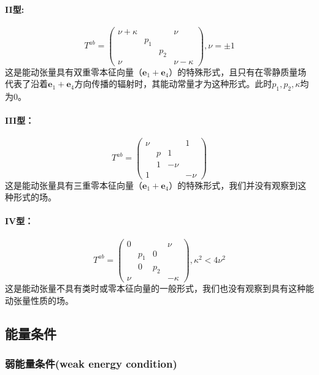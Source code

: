 \documentclass[hyperref, UTF8, a4paper]{ctexart}
\begin{document}
\paragraph{II型:}
\begin{equation*}
	T^{ab} =\begin{pmatrix}
		\nu +\kappa  &  &  & \nu \\
		& p_{1} &  & \\
		&  & p_{2} & \\
		\nu  &  &  & \nu -\kappa 
	\end{pmatrix} ,\nu =\pm 1
\end{equation*}
这是能动张量具有双重零本征向量（$\boldsymbol{e}_{1} +\boldsymbol{e}_{4}$）的特殊形式，且只有在零静质量场代表了沿着$\boldsymbol{e}_{1} +\boldsymbol{e}_{4}$方向传播的辐射时，其能动常量才为这种形式。此时$p_{1} ,p_{2} ,\kappa $均为$0$。

\paragraph{III型：}
\begin{equation*}
	T^{ab} =\begin{pmatrix}
		\nu  &  &  & 1\\
		& p & 1 & \\
		& 1 & -\nu  & \\
		1 &  &  & -\nu 
	\end{pmatrix}
\end{equation*}
这是能动张量具有三重零本征向量（$\boldsymbol{e}_{1} +\boldsymbol{e}_{4}$）的特殊形式，我们并没有观察到这种形式的场。

\paragraph{IV型：}
\begin{equation*}
	T^{ab} =\begin{pmatrix}
		0 &  &  & \nu \\
		& p_{1} & 0 & \\
		& 0 & p_{2} & \\
		\nu  &  &  & -\kappa 
	\end{pmatrix} ,\kappa ^{2} < 4\nu ^{2}
\end{equation*}
这是能动张量不具有类时或零本征向量的一般形式，我们也没有观察到具有这种能动张量性质的场。
\subsection{能量条件}
\subsubsection{弱能量条件(weak energy condition)}
\end{document}
